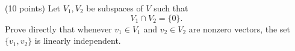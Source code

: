 \begin{exercise}
  \label{ex:hw07:disjoint-subspaces-independence}
  (10 points) Let \(V_1,V_2\) be subspaces of \(V\) such that
  \[
    V_1\cap V_2=\{0\}.
  \]
  Prove directly that whenever \(v_1\in V_1\) and \(v_2\in V_2\) are
  nonzero vectors, the set \(\{v_1,v_2\}\) is linearly independent.
\end{exercise}
